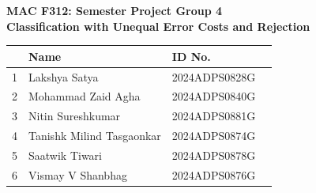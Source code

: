 \documentclass[11pt,a4paper]{article}
\begin{document}
\begin{center}
{\large\bfseries MAC F312: Semester Project \textbar{} Group 4}\\[6pt]
{\LARGE\bfseries Classification with Unequal Error Costs and Rejection}\\[10pt]
\footnotesize
\begin{tabular}{clll}
\toprule
& Name & ID No. \\
\midrule
1 & Lakshya Satya             & 2024ADPS0828G \\
2 & Mohammad Zaid Agha        & 2024ADPS0840G \\
3 & Nitin Sureshkumar         & 2024ADPS0881G  \\
4 & Tanishk Milind Tasgaonkar & 2024ADPS0874G \\
5 & Saatwik Tiwari            & 2024ADPS0878G \\

6 & Vismay V Shanbhag         & 2024ADPS0876G   \\
\bottomrule
\end{tabular}
\end{center}




\nocite{spambase}


\end{document}
